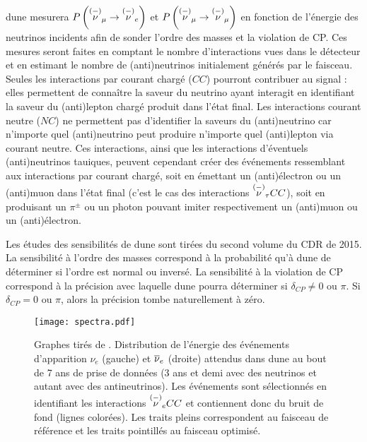         \gls{dune} mesurera $P\left(\overset{(-)}{\nu}_{\mu}\to\overset{(-)}{\nu}_e\right)$ et $P\left(\overset{(-)}{\nu}_{\mu}\to\overset{(-)}{\nu}_{\mu}\right)$ en fonction de l'énergie des neutrinos incidents afin de sonder l'ordre des masses et la violation de CP. Ces mesures seront faites en comptant le nombre d'interactions vues dans le détecteur et en estimant le nombre de (anti)neutrinos initialement générés par le faisceau. Seules les interactions par courant chargé ($CC$) pourront contribuer au signal : elles permettent de connaître la saveur du neutrino ayant interagit en identifiant la saveur du (anti)lepton chargé produit dans l'état final. Les interactions courant neutre ($NC$) ne permettent pas d'identifier la saveurs du (anti)neutrino car n'importe quel (anti)neutrino peut produire n'importe quel (anti)lepton via courant neutre. Ces interactions, ainsi que les interactions d'éventuels (anti)neutrinos tauiques, peuvent cependant créer des événements ressemblant aux interactions par courant chargé, soit en émettant un (anti)électron ou un (anti)muon dans l'état final (c'est le cas des interactions $\overset{(-)}{\nu}_{\tau} CC$), soit en produisant un $\pi^{\pm}$ ou un photon pouvant imiter respectivement un (anti)muon ou un (anti)électron.

        Les études des sensibilités de \gls{dune} sont tirées du second volume du CDR de 2015\cite{Collaboration2015}. La sensibilité à l'ordre des masses correspond à la probabilité qu'à \gls{dune} de déterminer si l'ordre est normal ou inversé. La sensibilité à la violation de CP correspond à la précision avec laquelle \gls{dune} pourra déterminer si $\delta_{CP} \neq 0$ ou $\pi$. Si $\delta_{CP} = 0$ ou $\pi$, alors la précision tombe naturellement à zéro. %

        \begin{figure}[htbp]
          \texttt{[image: spectra.pdf]}
          \caption[Distribution de l'énergie des événements attendus dans \acrshort{dune}]{\label{fig::spectra}Graphes tirés de \cite{Collaboration2015}. Distribution de l'énergie des événements d'apparition $\nu_e$ (gauche) et $\overline{\nu}_e$ (droite) attendus dans \acrshort{dune} au bout de 7 ans de prise de données (3 ans et demi avec des neutrinos et autant avec des antineutrinos). Les événements sont sélectionnés en identifiant les interactions $\overset{(-)}{\nu}_e CC$ et contiennent donc du bruit de fond (lignes colorées). Les traits pleins correspondent au faisceau de référence et les traits pointillés au faisceau optimisé.}
        \end{figure}

